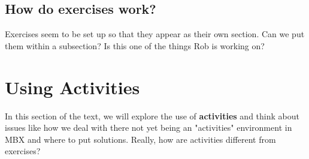 \documentclass[10pt,]{book}
\newcommand{\terminology}[1]{\textbf{#1}}
\theoremstyle{plain}
\theoremstyle{definition}
\theoremstyle{definition}
\theoremstyle{definition}
\begin{document}
\subsection[How do exercises work?]{How do exercises work?}\label{subsection-4}
Exercises seem to be set up so that they appear as their own section.  Can we put them within a subsection?  Is this one of the things Rob is working on?%
\typeout{************************************************}
\typeout{************************************************}
\section[Using Activities]{Using Activities}\label{ch-1-activities}
\typeout{************************************************}
\typeout{************************************************}
 In this section of the text, we will explore the use of \terminology{activities} and think about issues like how we deal with there not yet being an "activities" environment in MBX and where to put solutions.  Really, how are activities different from exercises? %
\typeout{************************************************}
\typeout{************************************************}
\end{document}

